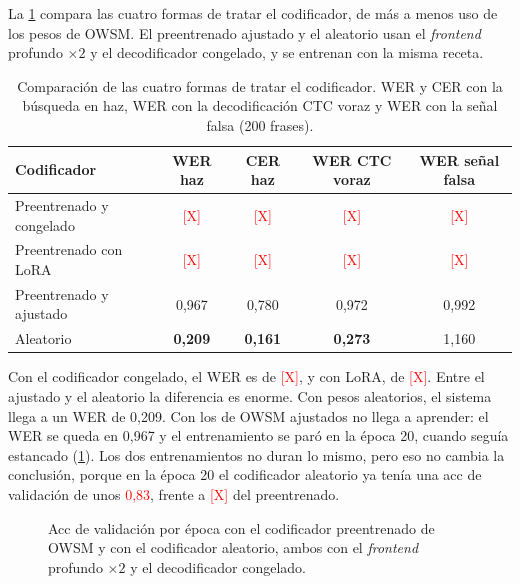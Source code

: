 La \cref{tab:res-codificador} compara las cuatro formas de tratar el codificador, de más a menos uso de los pesos de OWSM. El preentrenado ajustado y el aleatorio usan el \textit{frontend} profundo $\times 2$ y el decodificador congelado, y se entrenan con la misma receta.

\begin{table}[htbp]
  \centering
  \caption{Comparación de las cuatro formas de tratar el codificador. WER y CER con la búsqueda en haz, WER con la decodificación CTC voraz y WER con la señal falsa (200 frases).}
  \label{tab:res-codificador}
  \small
  \begin{tabular}{lcccc}
    \toprule
    \textbf{Codificador} & \textbf{WER haz} & \textbf{CER haz} & \textbf{WER CTC voraz} & \textbf{WER señal falsa} \\
    \midrule
    Preentrenado y congelado & \textcolor{red}{[X]} & \textcolor{red}{[X]} & \textcolor{red}{[X]} & \textcolor{red}{[X]} \\
    Preentrenado con LoRA    & \textcolor{red}{[X]} & \textcolor{red}{[X]} & \textcolor{red}{[X]} & \textcolor{red}{[X]} \\
    Preentrenado y ajustado  & 0,967          & 0,780          & 0,972          & 0,992 \\
    Aleatorio                & \textbf{0,209} & \textbf{0,161} & \textbf{0,273} & 1,160 \\
    \bottomrule
  \end{tabular}
\end{table}

Con el codificador congelado, el WER es de \textcolor{red}{[X]}, y con LoRA, de \textcolor{red}{[X]}. Entre el ajustado y el aleatorio la diferencia es enorme. Con pesos aleatorios, el sistema llega a un WER de 0,209. Con los de OWSM ajustados no llega a aprender: el WER se queda en 0,967 y el entrenamiento se paró en la época 20, cuando seguía estancado (\cref{fig:res-codificador}). Los dos entrenamientos no duran lo mismo, pero eso no cambia la conclusión, porque en la época 20 el codificador aleatorio ya tenía una acc de validación de unos \textcolor{red}{0,83}, frente a \textcolor{red}{[X]} del preentrenado.

\begin{figure}[htbp]
  \centering
  \caption{Acc de validación por época con el codificador preentrenado de OWSM y con el codificador aleatorio, ambos con el \textit{frontend} profundo $\times 2$ y el decodificador congelado.}
  \label{fig:res-codificador}
\end{figure}

